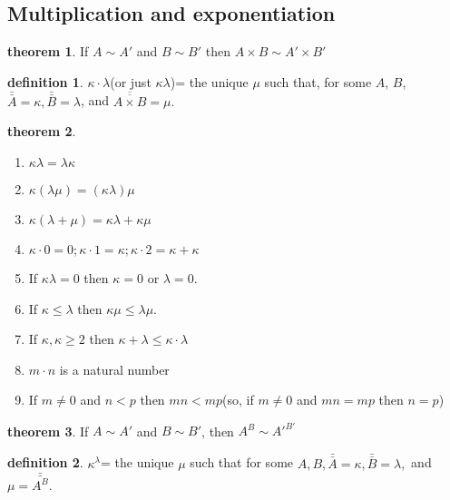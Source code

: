 \documentclass[a4paper,11pt]{article}%
\theoremstyle{remark}
\theoremstyle{definition}
\newtheorem{theorem}{theorem}[section]
\theoremstyle{definition}
\newtheorem*{definition}{definition}
\theoremstyle{plain}
\theoremstyle{definition}
\begin{document}
\subsection{Multiplication and exponentiation}
\begin{theorem}
    If $A\sim A'$ and $B\sim B'$ then $A\times B\sim A'\times B'$
\end{theorem}
\begin{definition}
    $\kappa\cdot\lambda$(or just $\kappa\lambda$)= the unique $\mu$ such that,
    for some $A$, $B$, $\bar{\bar{A}}=\kappa,\bar{\bar{B}}=\lambda$, and $\overline{\overline{A\times B}}=\mu.$
\end{definition}
\begin{theorem}
    \begin{enumerate}
        \item $\kappa\lambda=\lambda\kappa$
        \item $\kappa(\lambda\mu)=(\kappa\lambda)\mu$
        \item $\kappa(\lambda+\mu)=\kappa\lambda+\kappa\mu$
        \item $\kappa\cdot 0=0;\kappa\cdot 1=\kappa;\kappa\cdot 2=\kappa+\kappa$
        \item If $\kappa\lambda=0$ then $\kappa=0$ or $\lambda=0$.
        \item If $\kappa\leq\lambda$ then $\kappa\mu\leq\lambda\mu$.
        \item If $\kappa,\kappa\geq 2$ then $\kappa+\lambda\leq\kappa\cdot\lambda$
        \item $m\cdot n$ is a natural number
        \item If $m\neq 0$ and $n<p$ then $mn<mp$(so, if $m\neq 0 $ and $mn=mp$ then $n=p$)
    \end{enumerate}
\end{theorem}
\begin{theorem}
    If $A\sim A'$ and $B\sim B'$, then $A^B\sim A'^{B'}$
\end{theorem}
\begin{definition}
    $\kappa^{\lambda}$= the unique $\mu$ such that for some $A,B,\bar{\bar{A}}=\kappa,\bar{\bar{B}}=\lambda,$
    and $\mu=\bar{\bar{A^B}}.$
\end{definition}
\end{document}

